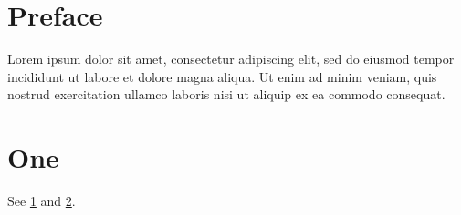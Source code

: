 \documentclass{book}
\begin{document}
\frontmatter
\chapter{Preface}\label{pre}
Lorem ipsum dolor sit amet, consectetur adipiscing elit, sed do eiusmod tempor incididunt ut labore et dolore magna aliqua.\label{p1} Ut enim ad minim veniam, quis nostrud exercitation ullamco laboris nisi ut aliquip ex ea commodo consequat.
\mainmatter
\chapter{One}\label{c1}
See \cref{pre} and \cref{c1}.
\end{document}
